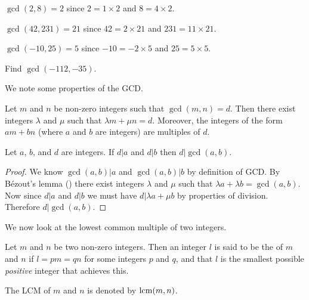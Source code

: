 \begin{example}
    $\gcd(2, 8) = 2$ since $2 = 1 \times 2$ and $8 = 4 \times 2$.
\end{example}

\begin{example}
    $\gcd(42, 231) = 21$ since $42 = 2 \times 21$ and $231 = 11 \times 21$.
\end{example}

\begin{example}
    $\gcd(-10, 25) = 5$ since $-10 = -2 \times 5$ and $25 = 5 \times 5$.
\end{example}

\begin{exercise}
    Find $\gcd(-112, -35)$.
\end{exercise}

We note some properties of the GCD.
\begin{lemma}[B\'{e}zout]\label{lemma-bezout}
    Let $m$ and $n$ be non-zero integers such that $\gcd(m, n) = d$. Then there exist integers $\lambda$ and $\mu$ such that $\lambda m + \mu n = d$. Moreover, the integers of the form $am + bn$ (where $a$ and $b$ are integers) are multiples of $d$.
\end{lemma}

\begin{proposition}\label{prop-gcd-divides-common-divisor}
    Let $a$, $b$, and $d$ are integers. If $d \vert a$ and $d \vert b$ then $d \vert \gcd(a, b)$.
\end{proposition}
\begin{proof}
    We know $\gcd(a,b) \vert a$ and $\gcd(a,b) \vert b$ by definition of GCD. By B\'{e}zout's lemma () there exist integers $\lambda$ and $\mu$ such that $\lambda a + \lambda b = \gcd(a,b)$. Now since $d \vert a$ and $d \vert b$ we must have $d \vert \lambda a + \mu b$ by properties of division. Therefore $d \vert \gcd(a,b)$.
\end{proof}

We now look at the lowest common multiple of two integers.
\begin{definition}
    Let $m$ and $n$ be two non-zero integers. Then an integer $l$ is said to be the  of $m$ and $n$ if $l = pm = qn$ for some integers $p$ and $q$, and that $l$ is the smallest possible \textit{positive} integer that achieves this.

    The LCM of $m$ and $n$ is denoted by $\mathrm{lcm}(m,n)$.
\end{definition}

